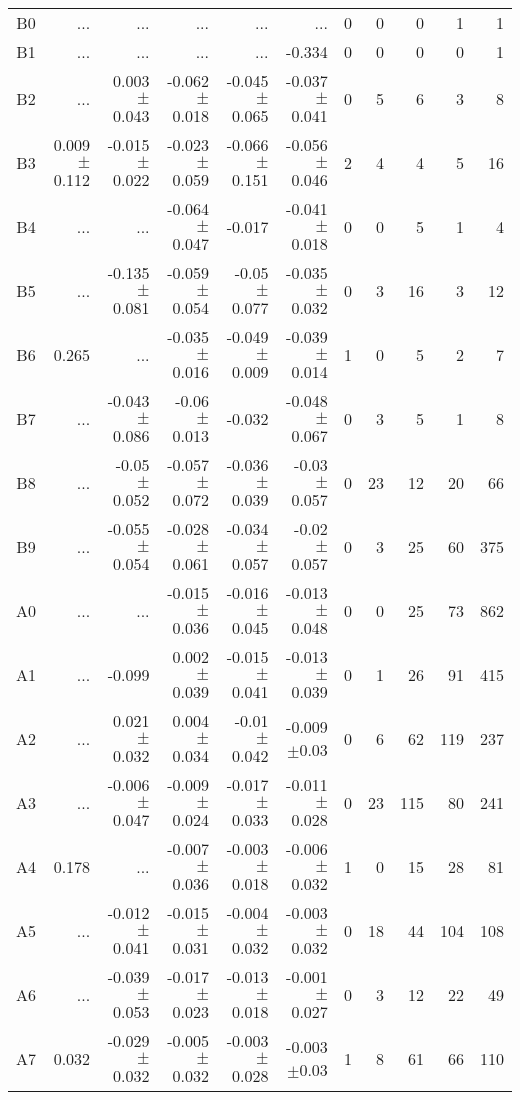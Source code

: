 \begin{table}[t]
\begin{table}[t]
\begin{center}
\begin{tabular}{c|rrrrr|rrrrr}
      
    B0	&	 ...	&	 ...	&	 ...	&	 ...	&	 ...	&	0	&	0	&	0	&	1	&	1	\\
    B1	&	 ...	&	 ...	&	 ...	&	 ...	&	-0.334	&	0	&	0	&	0	&	0	&	1	\\
    B2	&	 ...	&	0.003$\pm$0.043	&	-0.062$\pm$0.018	&	-0.045$\pm$0.065	&	-0.037$\pm$0.041	&	0	&	5	&	6	&	3	&	8	\\
    B3	&	0.009$\pm$0.112	&	-0.015$\pm$0.022	&	-0.023$\pm$0.059	&	-0.066$\pm$0.151	&	-0.056$\pm$0.046	&	2	&	4	&	4	&	5	&	16	\\
    B4	&	 ...	&	 ...	&	-0.064$\pm$0.047	&	-0.017	&	-0.041$\pm$0.018	&	0	&	0	&	5	&	1	&	4	\\
    B5	&	 ...	&	-0.135$\pm$0.081	&	-0.059$\pm$0.054	&	-0.05$\pm$0.077	&	-0.035$\pm$0.032	&	0	&	3	&	16	&	3	&	12	\\
    B6	&	0.265	&	 ...	&	-0.035$\pm$0.016	&	-0.049$\pm$0.009	&	-0.039$\pm$0.014	&	1	&	0	&	5	&	2	&	7	\\
    B7	&	 ...	&	-0.043$\pm$0.086	&	-0.06$\pm$0.013	&	-0.032	&	-0.048$\pm$0.067	&	0	&	3	&	5	&	1	&	8	\\
    B8	&	 ...	&	-0.05$\pm$0.052	&	-0.057$\pm$0.072	&	-0.036$\pm$0.039	&	-0.03$\pm$0.057	&	0	&	23	&	12	&	20	&	66	\\
    B9	&	 ...	&	-0.055$\pm$0.054	&	-0.028$\pm$0.061	&	-0.034$\pm$0.057	&	-0.02$\pm$0.057	&	0	&	3	&	25	&	60	&	375	\\
    A0	&	 ...	&	 ...	&	-0.015$\pm$0.036	&	-0.016$\pm$0.045	&	-0.013$\pm$0.048	&	0	&	0	&	25	&	73	&	862	\\
    A1	&	 ...	&	-0.099	&	0.002$\pm$0.039	&	-0.015$\pm$0.041	&	-0.013$\pm$0.039	&	0	&	1	&	26	&	91	&	415	\\
    A2	&	 ...	&	0.021$\pm$0.032	&	0.004$\pm$0.034	&	-0.01$\pm$0.042	&	-0.009$\pm$0.03	&	0	&	6	&	62	&	119	&	237	\\
    A3	&	 ...	&	-0.006$\pm$0.047	&	-0.009$\pm$0.024	&	-0.017$\pm$0.033	&	-0.011$\pm$0.028	&	0	&	23	&	115	&	80	&	241	\\
    A4	&	0.178	&	 ...	&	-0.007$\pm$0.036	&	-0.003$\pm$0.018	&	-0.006$\pm$0.032	&	1	&	0	&	15	&	28	&	81	\\
    A5	&	 ...	&	-0.012$\pm$0.041	&	-0.015$\pm$0.031	&	-0.004$\pm$0.032	&	-0.003$\pm$0.032	&	0	&	18	&	44	&	104	&	108	\\
    A6	&	 ...	&	-0.039$\pm$0.053	&	-0.017$\pm$0.023	&	-0.013$\pm$0.018	&	-0.001$\pm$0.027	&	0	&	3	&	12	&	22	&	49	\\
    A7	&	0.032	&	-0.029$\pm$0.032	&	-0.005$\pm$0.032	&	-0.003$\pm$0.028	&	-0.003$\pm$0.03	&	1	&	8	&	61	&	66	&	110	\\

\end{tabular}
\end{center}
\end{table}
\end{table}
